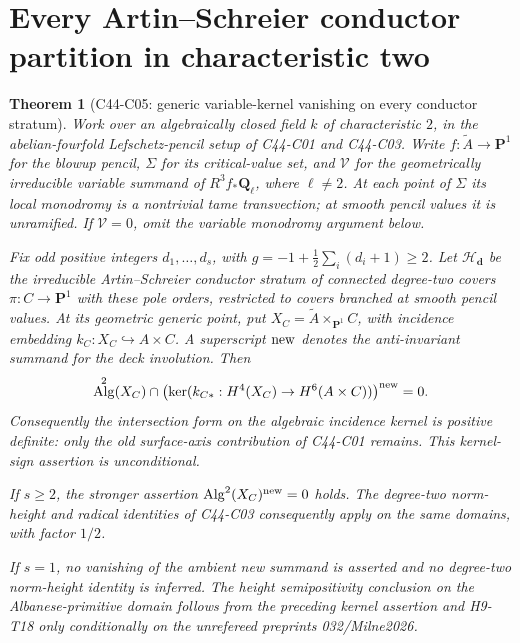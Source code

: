 \documentclass[11pt]{article}
\newtheorem{theorem}{Theorem}[section]
\theoremstyle{remark}\newtheorem{remark}[theorem]{Remark}
\DeclareMathOperator{\Alg}{Alg}
\begin{document}

\section{Every Artin--Schreier conductor partition in characteristic two}
\label{sec:c44-c05}

\begin{theorem}[C44-C05: generic variable-kernel vanishing on every conductor stratum]
Work over an algebraically closed field \(k\) of characteristic \(2\), in the
abelian-fourfold Lefschetz-pencil setup of C44-C01 and C44-C03.
Write \(f:\widetilde A\to\mathbf P^1\) for the blowup pencil, \(\Sigma\)
for its critical-value set, and \(\mathcal V\) for the geometrically
irreducible variable summand of \(R^3f_*\mathbf Q_\ell\), where
\(\ell\ne2\). At each point of \(\Sigma\) its local monodromy is a
nontrivial tame transvection; at smooth pencil values it is unramified.
If \(\mathcal V=0\), omit the variable monodromy argument below.

Fix odd positive integers \(d_1,\ldots,d_s\), with
\(g=-1+\frac12\sum_i(d_i+1)\ge2\). Let \(\mathcal H_{\mathbf d}\) be the
irreducible Artin--Schreier conductor stratum of connected degree-two
covers \(\pi:C\to\mathbf P^1\) with these pole orders, restricted to
covers branched at smooth pencil values. At its geometric generic point,
put \(X_C=\widetilde A\times_{\mathbf P^1}C\), with incidence embedding
\(k_C:X_C\hookrightarrow A\times C\). A superscript \({\rm new}\)
denotes the anti-invariant summand for the deck involution. Then
\[
 \Alg^2(X_C)\cap
 \bigl(\ker(k_{C*}:H^4(X_C)\to H^6(A\times C))\bigr)^{\rm new}=0.
\]
Consequently the intersection form on the algebraic incidence kernel
is positive definite: only the old surface-axis contribution of
C44-C01 remains. This kernel-sign assertion is unconditional.

If \(s\ge2\), the stronger assertion
\(\Alg^2(X_C)^{\rm new}=0\) holds. The degree-two norm-height and
radical identities of C44-C03 consequently apply on the same domains,
with factor \(1/2\).

If \(s=1\), no vanishing of the ambient new summand is asserted and
no degree-two norm-height identity is inferred. The height
semipositivity conclusion on the Albanese-primitive domain follows
from the preceding kernel assertion and H9-T18 only
\emph{conditionally on the unrefereed preprints 032/Milne2026}.
\end{theorem}
\end{document}
